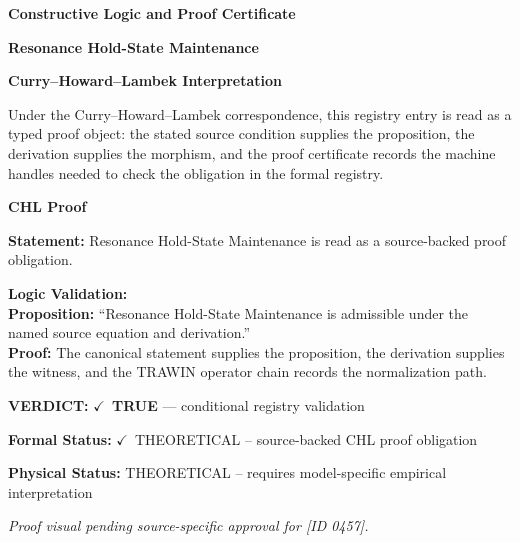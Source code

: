 \clearpage
\begingroup\tzpsupportsetup
\noindent\textbf{\fontsize{10.8pt}{12.8pt}\selectfont [ID 0457] Constructive Logic and Proof Certificate}\par
\noindent\textbf{\fontsize{10pt}{12pt}\selectfont Resonance Hold-State Maintenance}\par
\vspace{0.45em}
\begingroup
\footnotesize
\setlength{\parskip}{0.22em}
\setlength{\parindent}{0pt}
\noindent\textbf{Curry--Howard--Lambek Interpretation}\par
Under the Curry--Howard--Lambek correspondence, this registry entry is read as a typed proof
object: the stated source condition supplies the proposition, the derivation supplies the
morphism, and the proof certificate records the machine handles needed to check the obligation
in the formal registry.

\vspace{0.45em}
\noindent\textbf{CHL Proof}\par
\textbf{Statement:} Resonance Hold-State Maintenance is read as a source-backed proof obligation.

\textbf{Logic Validation:}\\
\textbf{Proposition:} ``Resonance Hold-State Maintenance is admissible under the named source equation and derivation.''\\
\textbf{Proof:} The canonical statement supplies the proposition, the derivation supplies the witness, and the TRAWIN operator chain records the normalization path.

\textbf{VERDICT:} \ensuremath{\checkmark}\ \textbf{TRUE} --- conditional registry validation

\textbf{Formal Status:} \ensuremath{\checkmark}\ THEORETICAL -- source-backed CHL proof obligation

\textbf{Physical Status:} THEORETICAL -- requires model-specific empirical interpretation
\par\vspace{0.45em}
\par
\vfill
\begingroup\footnotesize\itshape
Proof visual pending source-specific approval for [ID 0457].
\par\endgroup
\vfill
\endgroup
\endgroup
